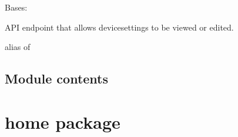 \documentclass[letterpaper,10pt,english]{sphinxmanual}
\begin{document}
\begin{fulllineitems}
\label{modules/farmer:farmer.views.DeviceSettingsViewSet}
Bases: 

API endpoint that allows devicesettings to be viewed or edited.

\begin{fulllineitems}
\label{modules/farmer:farmer.views.DeviceSettingsViewSet.list}
\end{fulllineitems}


\begin{fulllineitems}
\label{modules/farmer:farmer.views.DeviceSettingsViewSet.queryset}
\end{fulllineitems}


\begin{fulllineitems}
\label{modules/farmer:farmer.views.DeviceSettingsViewSet.retrieve}
\end{fulllineitems}


\begin{fulllineitems}
\label{modules/farmer:farmer.views.DeviceSettingsViewSet.serializer_class}
alias of 

\end{fulllineitems}


\end{fulllineitems}



\subsection{Module contents}
\label{modules/farmer:module-contents}\label{modules/farmer:module-farmer}

\section{home package}
\label{modules/home::doc}\label{modules/home:home-package}
\end{document}
